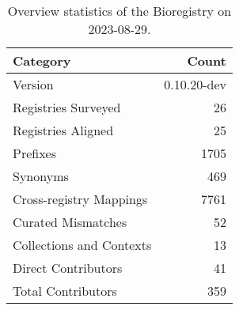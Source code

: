 \begin{table}
\caption{Overview statistics of the Bioregistry on 2023-08-29.}
\label{tab:bioregistry-summary}
\begin{tabular}{lr}
\toprule
Category & Count \\
\midrule
Version & 0.10.20-dev \\
Registries Surveyed & 26 \\
Registries Aligned & 25 \\
Prefixes & 1705 \\
Synonyms & 469 \\
Cross-registry Mappings & 7761 \\
Curated Mismatches & 52 \\
Collections and Contexts & 13 \\
Direct Contributors & 41 \\
Total Contributors & 359 \\
\bottomrule
\end{tabular}
\end{table}

